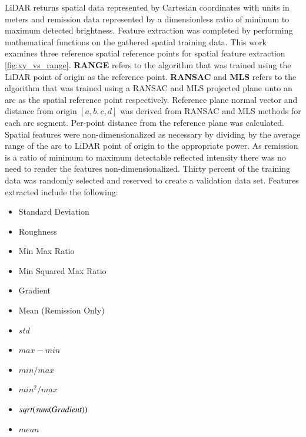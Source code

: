 \documentclass[numbered,pdftex]{ohio-etd}
\begin{document}
{{{{				{LiDAR returns spatial data represented by Cartesian coordinates with units in meters and remission data represented by a dimensionless ratio of minimum to maximum detected brightness. Feature extraction was completed by performing mathematical functions on the gathered spatial training data. This work examines three reference spatial reference points for spatial feature extraction \ref{fig:xy_vs_range}. \textbf{RANGE} refers to the algorithm that was trained using the LiDAR point of origin as the reference point. \textbf{RANSAC} and \textbf{MLS} refers to the algorithm that was trained using a RANSAC and MLS projected plane unto an arc as the spatial reference point respectively. Reference plane normal vector and distance from origin $[a,b,c,d]$ was derived from RANSAC and MLS methods for each arc segment. Per-point distance from the reference plane was calculated. Spatial features were non-dimensionalized as necessary by dividing by the average range of the arc to LiDAR point of origin to the appropriate power. As remission is a ratio of minimum to maximum detectable reflected intensity there was no need to render the features non-dimensionalized. Thirty percent of the training data was randomly selected and reserved to create a validation data set. Features extracted include the following:}
				
				\begin{multicols}{2}
					\begin{itemize}[itemsep=.1pt]
						\item Standard Deviation
						\item Roughness
						\item Min Max Ratio
						\item Min Squared Max Ratio
						\item Gradient
						\item Mean (Remission Only)
					\end{itemize}
					\vfill\null
					\columnbreak
					\begin{itemize}[itemsep=.1pt]
						\item $std$
						\item $max - min$
						\item $min / max$
						\item $min^2 / max$
						\item $sqrt(sum(Gradient\*))$
						\item $mean$
					\end{itemize}
					\vfill\null
					\label{lst:feature_list}
				\end{multicols}
				
}}}}
\end{document}
